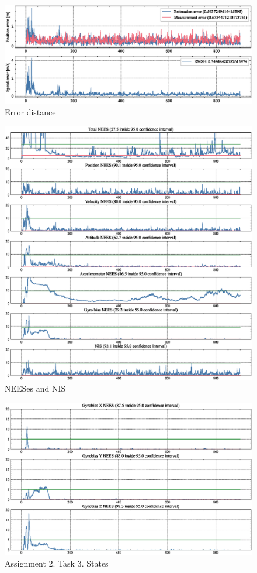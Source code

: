 \begin{figure}
    \centering
    \includegraphics[clip, trim= 0cm 0cm 0cm 0cm, width = \textwidth]{figures/sim_4.eps}
    \caption{Error distance}
    \label{fig:23state_error}
\end{figure}
\begin{figure}
    \centering
    \includegraphics[clip, trim= 0cm 0cm 0cm 0cm, width = \textwidth]{figures/sim_5.eps}
    \caption{NEESes and NIS}
    \label{fig:23states}
\end{figure}
\begin{figure}
    \centering
    \includegraphics[clip, trim= 0cm 0cm 0cm 0cm, width = \textwidth]{figures/sim_8.eps}
    \caption{Assignment 2. Task 3. States}
    \label{fig:23states}
\end{figure}